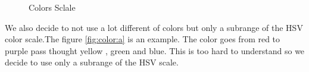 \documentclass[]{usiinfbachelorproject}
\begin{document}
 
\begin{figure}[h]
\centering
{}
\hspace*{\fill}

\caption{Colors Sclale}
\label{fig:color}
\end{figure}
 We also decide to not use a lot different of colors but only a subrange of the HSV color scale.The figure \ref{fig:color:a} is an example. The color goes from red to purple pass thought yellow , green and blue. This is too hard to understand so we decide to use only a subrange of the HSV scale.
\end{document}

